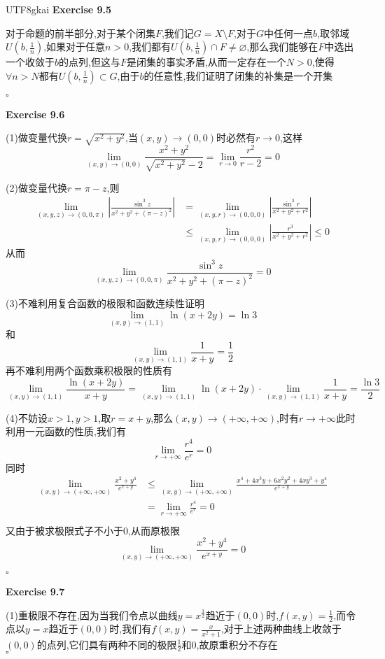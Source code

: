 \documentclass{article}
\newenvironment{exercise}[1]{%
{\textbf{Exercise #1} \\ 
    }
}{
  \hfill $\square$ 
  \par\bigskip 
}
\newcommand{\abs}[1]{\left|#1\right|}
\begin{document}
\begin{CJK}{UTF8}{gkai}
\begin{exercise}{9.5}
    对于命题的前半部分,对于某个闭集$F$,我们记$G = X \setminus F$,对于$G$中任何一点$b$,取邻域$U(b,\frac{1}{n})$,如果对于任意$n > 0$,我们都有$U(b,\frac{1}{n}) \cap F \neq \varnothing$,那么我们能够在$F$中选出一个收敛于$b$的点列,但这与$F$是闭集的事实矛盾,从而一定存在一个$N > 0$,使得$\forall n > N$都有$U(b,\frac{1}{n}) \subset G$,由于$b$的任意性,我们证明了闭集的补集是一个开集
\end{exercise}

\begin{exercise}{9.6}
    (1)做变量代换$r = \sqrt{x^2 + y^2}$,当$(x,y)\to (0,0)$时必然有$r \to 0$,这样
    \[\lim_{(x,y)\to(0,0)} \frac{x^2 + y^2}{\sqrt{x^2 + y^2} - 2} = \lim_{r \to 0}\frac{r^2}{r - 2} = 0\]

    (2)做变量代换$r = \pi - z$,则
    \[
    \begin{aligned}
        \lim_{(x,y,z)\to(0,0,\pi)} \abs{\frac{\sin^3 z}{x^2 + y^2 + (\pi - z)^2}} &= \lim_{(x,y,r)\to(0,0,0)} \abs{\frac{\sin^3 r}{x^2 + y^2 + r^2}}\\
        &\leq \lim_{(x,y,r)\to(0,0,0)} \abs{\frac{r^3}{x^2 + y^2 + r^2}} \leq 0
    \end{aligned}    
    \]
    从而
    \[\lim_{(x,y,z)\to(0,0,\pi)} \frac{\sin^3 z}{x^2 + y^2 + (\pi - z)^2} = 0\]

    (3)不难利用复合函数的极限和函数连续性证明
    \[\lim_{(x,y)\to(1,1)} \ln(x + 2y) = \ln 3\]
    和
    \[\lim_{(x,y)\to(1,1)} \frac{1}{x + y} = \frac{1}{2}\]
    再不难利用两个函数乘积极限的性质有
    \[\lim_{(x,y)\to(1,1)} \frac{\ln(x + 2y)}{x + y} = \lim_{(x,y)\to(1,1)} \ln(x + 2y)  \cdot \lim_{(x,y)\to(1,1)} \frac{1}{x + y} = \frac{\ln 3}{2}\]
    
    (4)不妨设$x > 1,y > 1$,取$r = x + y$,那么$(x,y)\to(+\infty,+\infty)$,时有$r \to +\infty$此时利用一元函数的性质,我们有
    \[\lim_{r \to +\infty}\frac{r^4}{e^r} = 0\]
    同时
    \[
    \begin{aligned}
    \lim_{(x,y)\to(+\infty,+\infty)} \frac{x^2 + y^4}{e^{x+ y}} &\leq \lim_{(x,y)\to(+\infty,+\infty)} \frac{x^4 + 4x^3 y + 6 x^2 y^2 + 4 xy^3+ y^4}{e^{x+ y}}\\
    &= \lim_{r \to +\infty}\frac{r^4}{e^r} = 0     \\   
    \end{aligned}    
    \]
    又由于被求极限式子不小于$0$,从而原极限
    \[\lim_{(x,y)\to(+\infty,+\infty)} \frac{x^2 + y^4}{e^{x+ y}} = 0\]
\end{exercise}

\begin{exercise}{9.7}
    (1)重极限不存在,因为当我们令点以曲线$y = x^{\frac{3}{2}}$趋近于$(0,0)$时,$f(x,y) = \frac{1}{2}$,而令点以$y = x$趋近于$(0,0)$时,我们有$f(x,y) = \frac{x}{x^2 + 1}$,对于上述两种曲线上收敛于$(0,0)$的点列,它们具有两种不同的极限$\frac{1}{2}$和$0$,故原重积分不存在\\


\end{exercise}
\end{CJK}
\end{document}
